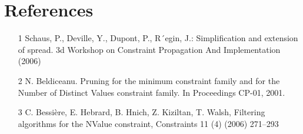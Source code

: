 \documentclass[a4paper,12pt]{article}
\begin{document}
\section {References}
\begin{enumerate}
\item [1] Schaus, P., Deville, Y., Dupont, P., R´egin, J.: Simplification and extension of spread. 3d
Workshop on Constraint Propagation And Implementation (2006)
\item [2] N. Beldiceanu. Pruning for the minimum constraint family and for the Number of Distinct Values constraint family. In Proceedings CP-01, 2001.
\item [3] C. Bessière, E. Hebrard, B. Hnich, Z. Kiziltan, T. Walsh, Filtering algorithms for the NValue constraint, Constraints 11 (4) (2006) 271–293


\end{enumerate} 
\end{document}
